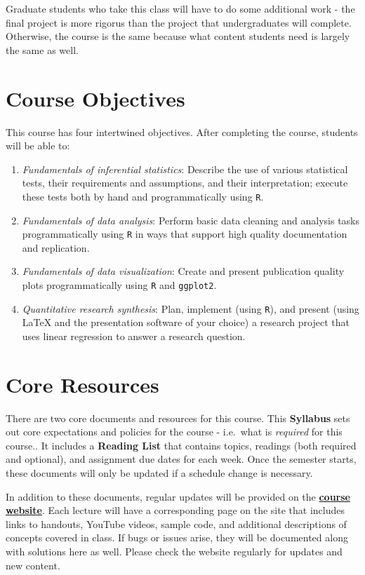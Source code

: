 \documentclass[]{book}
\theoremstyle{definition}
\theoremstyle{definition}
\theoremstyle{definition}
\theoremstyle{remark}
\begin{document}
Graduate students who take this class will have to do some additional
work - the final project is more rigorus than the project that
undergraduates will complete. Otherwise, the course is the same because
what content students need is largely the same as well.

\section{Course Objectives}\label{course-objectives}

This course has four intertwined objectives. After completing the
course, students will be able to:

\begin{enumerate}
\def\labelenumi{\arabic{enumi}.}
\item
  \emph{Fundamentals of inferential statistics}: Describe the use of
  various statistical tests, their requirements and assumptions, and
  their interpretation; execute these tests both by hand and
  programmatically using \texttt{R}.
\item
  \emph{Fundamentals of data analysis}: Perform basic data cleaning and
  analysis tasks programmatically using \texttt{R} in ways that support
  high quality documentation and replication.
\item
  \emph{Fundamentals of data visualization}: Create and present
  publication quality plots programmatically using \texttt{R} and
  \texttt{ggplot2}.
\item
  \emph{Quantitative research synthesis}: Plan, implement (using
  \texttt{R}), and present (using LaTeX and the presentation software of
  your choice) a research project that uses linear regression to answer
  a research question.
\end{enumerate}

\section{Core Resources}\label{core-resources}

There are two core documents and resources for this course. This
\textbf{Syllabus} sets out core expectations and policies for the course
- i.e.~what is \emph{required} for this course.. It includes a
\textbf{Reading List} that contains topics, readings (both required and
optional), and assignment due dates for each week. Once the semester
starts, these documents will only be updated if a schedule change is
necessary.

In addition to these documents, regular updates will be provided on the
\href{https://slu-soc5050.github.io}{\textbf{course website}}. Each
lecture will have a corresponding page on the site that includes links
to handouts, YouTube videos, sample code, and additional descriptions of
concepts covered in class. If bugs or issues arise, they will be
documented along with solutions here as well. Please check the website
regularly for updates and new content.
\end{document}
